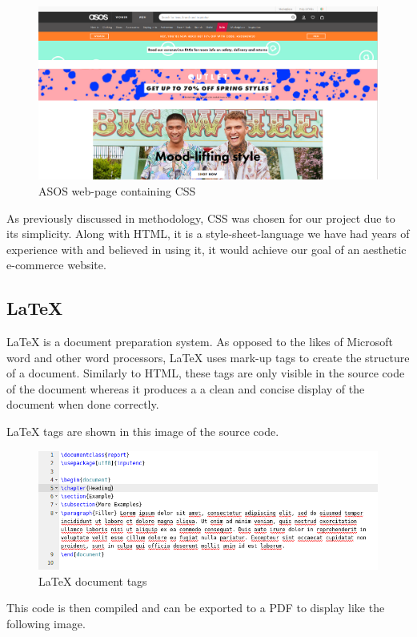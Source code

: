 \begin{figure}[h]
    \centering
    \includegraphics[scale=0.2]{img/withCss.png}
    \caption{ASOS web-page containing CSS}
    \label{fig:my_label}
\end{figure}
\newpage
As previously discussed in methodology, CSS was chosen for our project due to its simplicity. Along with HTML, it is a style-sheet-language we have had years of experience with and believed in using it, it would achieve our goal of an aesthetic e-commerce website.

\subsection{LaTeX}
LaTeX is a document preparation system. As opposed to the likes of Microsoft word and other word processors, LaTeX uses mark-up tags to create the structure of a document. Similarly to HTML, these tags are only visible in the source code of the document whereas it produces a a clean and concise display of the document when done correctly.

LaTeX tags are shown in this image of the source code.

\begin{figure}[h]
    \centering
    \includegraphics[scale=0.4]{img/LaTeX-Example-1.png}
    \caption{LaTeX document tags}
    \label{fig:my_label}
\end{figure}
\newpage
This code is then compiled and can be exported to a PDF to display like the following image.

